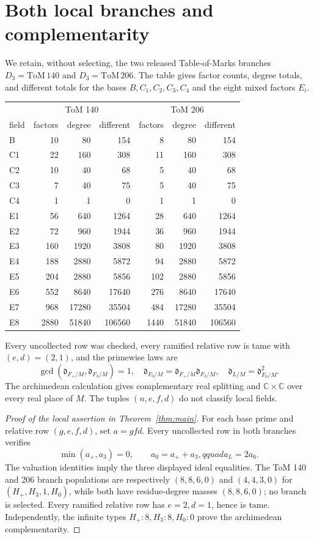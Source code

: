 \documentclass[11pt]{article}
\begin{document}
\section{Both local branches and complementarity}
We retain, without selecting, the two released Table-of-Marks branches $D_3=\mathrm{ToM}\,140$
and $D_3=\mathrm{ToM}\,206$.  The table gives factor counts, degree totals, and different totals
for the bases $B,C_1,C_2,C_3,C_4$ and the eight mixed factors $E_i$.
\begin{center}\scriptsize
\begin{tabular}{@{}lrrr|rrr@{}}\toprule &\multicolumn{3}{c|}{ToM 140}&\multicolumn{3}{c}{ToM 206}\\field&factors&degree&different&factors&degree&different\\\midrule
B&10&80&154&8&80&154\\C1&22&160&308&11&160&308\\C2&10&40&68&5&40&68\\C3&7&40&75&5&40&75\\C4&1&1&0&1&1&0\\
E1&56&640&1264&28&640&1264\\E2&72&960&1944&36&960&1944\\E3&160&1920&3808&80&1920&3808\\E4&188&2880&5872&94&2880&5872\\E5&204&2880&5856&102&2880&5856\\E6&552&8640&17640&276&8640&17640\\E7&968&17280&35504&484&17280&35504\\E8&2880&51840&106560&1440&51840&106560\\\bottomrule\end{tabular}\end{center}
Every uncollected row was checked, every ramified relative row is tame with $(e,d)=(2,1)$,
and the primewise laws are
\[
\gcd(\mathfrak d_{F_+/M},\mathfrak d_{F_3/M})=1,\quad
\mathfrak d_{F_0/M}=\mathfrak d_{F_+/M}\mathfrak d_{F_3/M},\quad
\mathfrak d_{L/M}=\mathfrak d_{F_0/M}^2.
\]
The archimedean calculation gives complementary real splitting and $\mathbb C\times\mathbb C$
over every real place of $M$.  The tuples $(n,e,f,d)$ do not classify local fields.

\begin{proof}[Proof of the local assertion in Theorem~\ref{thm:main}]
For each base prime and relative row $(g,e,f,d)$, set $a=gfd$.  Every uncollected row in
both branches verifies
\[
\min(a_+,a_3)=0,\qquad a_0=a_++a_3,qquad a_L=2a_0.
\]
The valuation identities imply the three displayed ideal equalities.  The ToM 140 and 206
branch populations are respectively $(8,8,6,0)$ and $(4,4,3,0)$ for
$(H_+,H_3,1,H_0)$, while both have residue-degree masses $(8,8,6,0)$; no branch is
selected.  Every ramified relative row has $e=2,d=1$, hence is tame.  Independently, the
infinite types $H_+:8,H_3:8,H_0:0$ prove the archimedean complementarity.
\end{proof}
\end{document}
